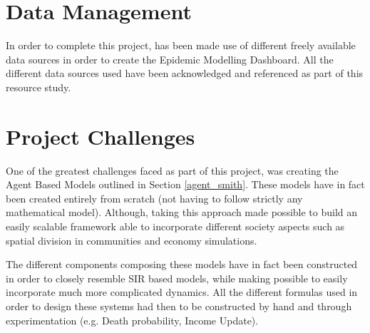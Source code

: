 \section{Data Management}
In order to complete this project, has been made use of different freely available data sources in order to create the Epidemic Modelling Dashboard. All the different data sources used have been acknowledged and referenced as part of this resource study. 

\section{Project Challenges}
One of the greatest challenges faced as part of this project, was creating the Agent Based Models outlined in Section \ref{agent_smith}. These models have in fact been created entirely from scratch (not having to follow strictly any mathematical model). Although, taking this approach made possible to build an easily scalable framework able to incorporate different society aspects such as spatial division in communities and economy simulations. 

The different components composing these models have in fact been constructed in order to closely resemble SIR based models, while making possible to easily incorporate much more complicated dynamics. All the different formulas used in order to design these systems had then to be constructed by hand and through experimentation (e.g. Death probability, Income Update).